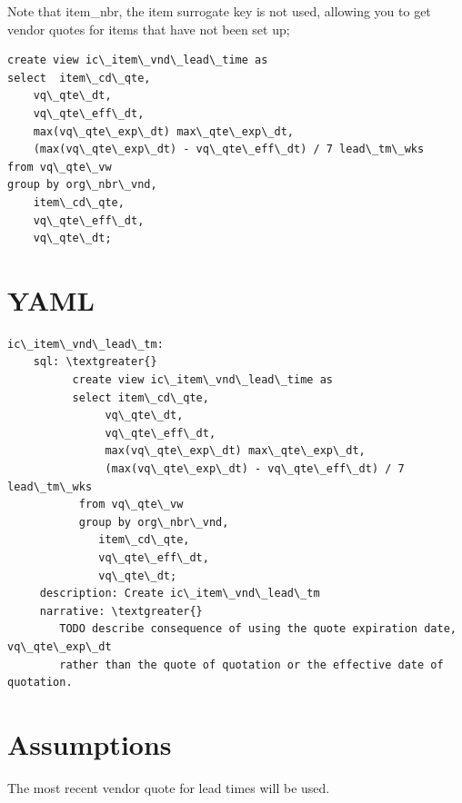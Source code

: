 \documentclass[letterpaper,10pt,english]{sphinxmanual}
\begin{document}
Note that item\_nbr, the item surrogate key is not used, allowing you to
get vendor quotes for items that have not been set up;
\begin{Verbatim}[commandchars=\\\{\}]
create view ic\_item\_vnd\_lead\_time as
select  item\_cd\_qte,
    vq\_qte\_dt,
    vq\_qte\_eff\_dt,
    max(vq\_qte\_exp\_dt) max\_qte\_exp\_dt,
    (max(vq\_qte\_exp\_dt) - vq\_qte\_eff\_dt) / 7 lead\_tm\_wks
from vq\_qte\_vw
group by org\_nbr\_vnd,
    item\_cd\_qte,
    vq\_qte\_eff\_dt,
    vq\_qte\_dt;
\end{Verbatim}


\section{YAML}
\label{Portal/400-MultipleLeadTimes:yaml}
\begin{Verbatim}[commandchars=\\\{\}]
ic\_item\_vnd\_lead\_tm:
    sql: \textgreater{}
          create view ic\_item\_vnd\_lead\_time as
          select item\_cd\_qte,
               vq\_qte\_dt,
               vq\_qte\_eff\_dt,
               max(vq\_qte\_exp\_dt) max\_qte\_exp\_dt,
               (max(vq\_qte\_exp\_dt) - vq\_qte\_eff\_dt) / 7 lead\_tm\_wks
           from vq\_qte\_vw
           group by org\_nbr\_vnd,
              item\_cd\_qte,
              vq\_qte\_eff\_dt,
              vq\_qte\_dt;
     description: Create ic\_item\_vnd\_lead\_tm
     narrative: \textgreater{}
        TODO describe consequence of using the quote expiration date, vq\_qte\_exp\_dt
        rather than the quote of quotation or the effective date of quotation.
\end{Verbatim}


\section{Assumptions}
\label{Portal/400-MultipleLeadTimes:assumptions}
The most recent vendor quote for lead times will be used.
\end{document}
